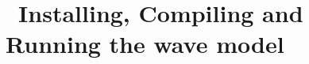 \section{~Installing, Compiling and Running the wave model} \label{chapt:impl}
\newcounters



\pb





